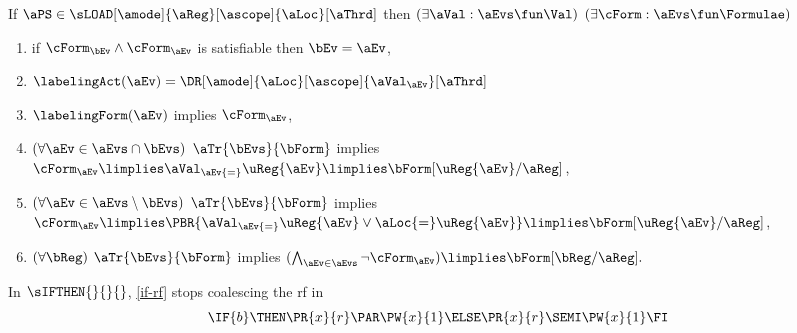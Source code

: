 \medskip
  If $\aPS \in \sLOAD[\amode]{\aReg}[\ascope]{\aLoc}[\aThrd]$ then
  $(\exists\aVal:\aEvs\fun\Val)$
  $(\exists\cForm:\aEvs\fun\Formulae)$
  \begin{enumerate}[topsep=0pt]
  \item
    if $\cForm_\bEv\land\cForm_\aEv$ is satisfiable then $\bEv=\aEv$,
  \item
    $\labelingAct(\aEv) = \DR[\amode]{\aLoc}[\ascope]{\aVal_\aEv}[\aThrd]$
  \item
    $\labelingForm(\aEv)$ implies
    \begin{math}
      \cForm_\aEv
    \end{math},
    
  \item
    \begin{math}
      (\forall\aEv\in\aEvs\cap\bEvs)
    \end{math}
    $\aTr{\bEvs}{\bForm}$ implies
    \begin{math}
      \cForm_\aEv
      \limplies \aVal_\aEv{=}\uReg{\aEv}
      \limplies \bForm[\uReg{\aEv}/\aReg]
    \end{math},
    
  \item
    \begin{math}
      (\forall\aEv\in\aEvs\setminus\bEvs)
    \end{math}
    $\aTr{\bEvs}{\bForm}$ implies
    \begin{math}
      \cForm_\aEv 
      \limplies
      \PBR{\aVal_\aEv{=}\uReg{\aEv} \lor \aLoc{=}\uReg{\aEv}}
      \limplies
      \bForm[\uReg{\aEv}/\aReg]
    \end{math},
    \item
      \begin{math}
        (\forall\bReg)
      \end{math}
      $\aTr{\bEvs}{\bForm}$  implies 
      \begin{math}
        (\bigwedge_{\aEv\in\aEvs}\lnot\cForm_\aEv)
        \limplies 
        \bForm[\bReg/\aReg].
      \end{math}  
  \end{enumerate}  
\medskip

In $\sIFTHEN{}{}{}$, \eqref{if-rf} stops coalescing the rf in
\begin{displaymath}
  \IF{b}\THEN\PR{x}{r}\PAR\PW{x}{1}\ELSE\PR{x}{r}\SEMI\PW{x}{1}\FI
\end{displaymath}


